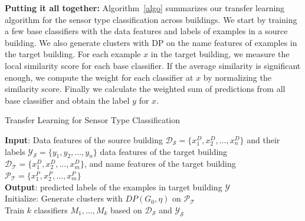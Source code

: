 {\bf Putting it all together:} Algorithm~\ref{algo} summarizes our transfer learning algorithm for the sensor type classification across buildings. 
We start by training a few base classifiers with the data features and labels of examples in a source building. We also generate clusters with DP on the name features of examples in the target building. For each example $x$ in the target building, we measure the local similarity score for each base classifier. If the average similarity is significant enough, we compute the weight for each classifier at $x$ by normalizing the similarity score. Finally we calculate the weighted sum of predictions from all base classifier and obtain the label $y$ for $x$.

\begin{algorithm}[ht]
 \caption{Transfer Learning for Sensor Type Classification}
 \label{algo}
 {\bf Input}: Data features of the source building $\mathcal{D_S}=\{x^D_1,x^D_2,\dots,x^D_n\}$ and their labels $\mathcal{Y_S}=\{y_1,y_2,\dots,y_n\}$  data features of the target building $\mathcal{D_T}=\{x^D_1,x^D_2,\dots,x^D_m\}$, and name features of the target building $\mathcal{P_T}=\{x^P_1,x^P_2,\dots,x^P_m\}$\\
 {\bf Output}: predicted labels of the examples in target building $\mathcal{Y}$\\
 Initialize: Generate clusters with $DP(G_{0}, \eta)$ on $\mathcal{P_T}$\\
 Train $k$ classifiers $M_1, \dots, M_k$ based on $\mathcal{D_S}$ and $\mathcal{Y_S}$\;

\end{algorithm}
